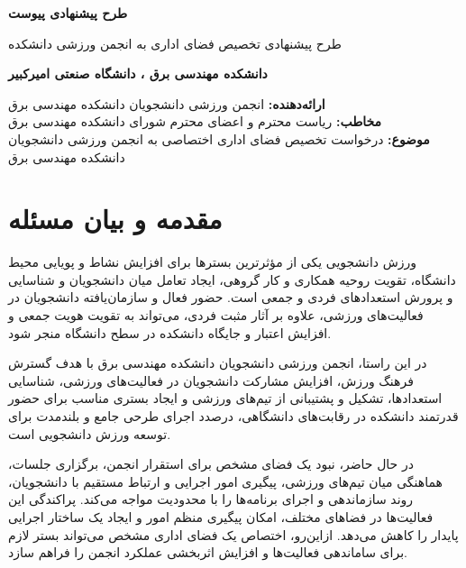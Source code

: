 \documentclass[12pt,a4paper]{article}
\newcommand{\UniversityName}{دانشگاه صنعتی امیرکبیر}
\newcommand{\FacultyName}{دانشکده مهندسی برق}
\newcommand{\SenderTitle}{انجمن ورزشی دانشجویان دانشکده مهندسی برق}
\newcommand{\LetterSubject}{درخواست تخصیص فضای اداری اختصاصی به انجمن ورزشی دانشجویان دانشکده مهندسی برق}
\newcommand{\ProposalTitle}{طرح پیشنهادی تخصیص فضای اداری به انجمن ورزشی}
\begin{document}
\newpage

\begin{center}
    {\large\bfseries طرح پیشنهادی پیوست} \\[0.25cm]
    {\LARGE\titr \ProposalTitle{} دانشکده \par}
    \vspace{0.2cm}
    {\large\bfseries \FacultyName{} ، \UniversityName \par}
    \vspace{0.3cm}
\end{center}

\noindent
\textbf{ارائه‌دهنده:} \SenderTitle \\
\textbf{مخاطب:} ریاست محترم و اعضای محترم شورای \FacultyName \\
\textbf{موضوع:} \LetterSubject \\

\section{مقدمه و بیان مسئله}
ورزش دانشجویی یکی از مؤثرترین بسترها برای افزایش نشاط و پویایی محیط دانشگاه، تقویت روحیه همکاری و کار گروهی، ایجاد تعامل میان دانشجویان و شناسایی و پرورش استعدادهای فردی و جمعی است. حضور فعال و سازمان‌یافته دانشجویان در فعالیت‌های ورزشی، علاوه بر آثار مثبت فردی، می‌تواند به تقویت هویت جمعی و افزایش اعتبار و جایگاه دانشکده در سطح دانشگاه منجر شود.

در این راستا، \SenderTitle{} با هدف گسترش فرهنگ ورزش، افزایش مشارکت دانشجویان در فعالیت‌های ورزشی، شناسایی استعدادها، تشکیل و پشتیبانی از تیم‌های ورزشی و ایجاد بستری مناسب برای حضور قدرتمند دانشکده در رقابت‌های دانشگاهی، درصدد اجرای طرحی جامع و بلندمدت برای توسعه ورزش دانشجویی است.

در حال حاضر، نبود یک فضای مشخص برای استقرار انجمن، برگزاری جلسات، هماهنگی میان تیم‌های ورزشی، پیگیری امور اجرایی و ارتباط مستقیم با دانشجویان، روند سازماندهی و اجرای برنامه‌ها را با محدودیت مواجه می‌کند. پراکندگی این فعالیت‌ها در فضاهای مختلف، امکان پیگیری منظم امور و ایجاد یک ساختار اجرایی پایدار را کاهش می‌دهد. ازاین‌رو، اختصاص یک فضای اداری مشخص می‌تواند بستر لازم برای ساماندهی فعالیت‌ها و افزایش اثربخشی عملکرد انجمن را فراهم سازد.
\end{document}
